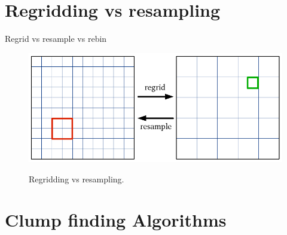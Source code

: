 \documentclass[11pt,oneside,chapters]{starlink}
\begin{document}
\chapter{Regridding vs resampling}
\label{app:regrid}
Regrid vs resample vs rebin

\begin{figure}[h!]
\begin{center}
\includegraphics[width=0.8\linewidth]{sc20_regrid}
\label{fig:regrid}
\caption{Regridding vs resampling.}
\end{center}
\end{figure}


\newpage
\chapter{Clump finding Algorithms}
\label{app:clumpfind}
\end{document}
